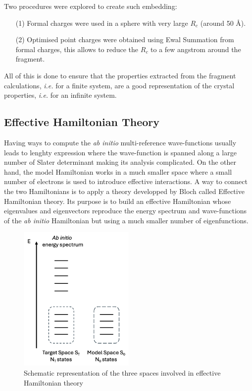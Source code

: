 \documentclass[12pt]{report}
\numberwithin{equation}{section}
\begin{document}
Two procedures were explored to create such embedding:
\begin{itemize}
    \item[(1)] Formal charges were used in a sphere with very large $R_c$ (around 50 \AA{}).
    \item[(2)] Optimised point charges were obtained using Ewal Summation from formal charges, this allows to reduce the $R_c$ to a few angstrom around the fragment.
\end{itemize}

All of this is done to ensure that the properties extracted from the fragment calculations, \textit{i.e.} for a finite system, are a good representation of the crystal properties, \textit{i.e.} for an infinite system.

\subsection{Effective Hamiltonian Theory}

Having ways to compute the \textit{ab initio} multi-reference wave-functions usually leads to lenghty expression where the wave-function is spanned along a large number of Slater determinant making its analysis complicated.
On the other hand, the model Hamiltonian works in a much smaller space where a small number of electrons is used to introduce effective interactions.
A way to connect the two Hamiltonians is to apply a theory developped by Bloch called Effective Hamiltonian theory. 
Its purpose is to build an effective Hamiltonian whose eigenvalues and eigenvectors reproduce the energy spectrum and wave-functions of the \textit{ab initio} Hamiltonian but using a much smaller number of eigenfunctions.

\begin{figure}[!ht]
    \centering
    \includegraphics[width=0.5\textwidth]{Images/HEFF.schema.png}
    \caption{Schematic representation of the three spaces involved in effective Hamiltonian theory}
    \label{fig:Heff}
\end{figure}
\end{document}
